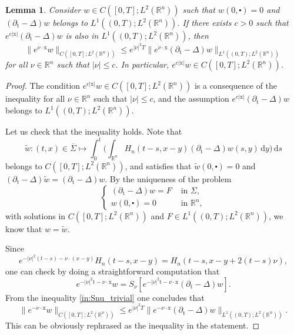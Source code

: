 \documentclass[10pt,a4paper]{amsart}
\newtheorem{lemma}[proposition]{Lemma}
\newcommand{\R}{\mathbb{R}}
\newcommand{\dd}{\mathrm{d}}
\newcommand{\tm}{\mathrm{t}}
\newcommand{\x}{\mathrm{x}}
\begin{document}
\begin{lemma}\label{lem:propagation_of_decay}\sl Consider $w \in C([0, T] ; L^{2}(\mathbb{R}^{n}))$ such that $w(0, \centerdot)=0$ 
and $(\partial_{\tm}-\Delta)w $ belongs to $ L^{1}((0, T) ; L^{2}(\mathbb{R}^{n}))$.
If there exists $c > 0$ such that 
$e^{c|\x|} (\partial_{\tm}-\Delta)w $ is also in $L^{1}((0, T) ; L^{2}(\mathbb{R}^{n}))$, then
\[ \|e^{\nu \cdot \x} w\|_{C([0, T] ; L^{2}(\mathbb{R}^{n}))} \leq e^{|\nu|^2 T} \|e^{\nu \cdot \x} (\partial_{\tm}-\Delta)w\|_{L^{1}((0, T) ; L^{2}(\mathbb{R}^{n}))} \]
for all $\nu \in \R^n$ such that $|\nu| \leq c$. In particular, 
$e^{c|\x|} w \in C([0, T] ; L^{2}(\mathbb{R}^{n}))$.
\end{lemma}

\begin{proof}
The condition $e^{c|\x|} w \in C([0, T] ; L^{2}(\mathbb{R}^{n}))$ is a consequence of the inequality for all $\nu \in \R^n$ such that $|\nu| \leq c$, and the assumption
$e^{c|\x|} (\partial_{\tm}-\Delta)w $ belongs to $ L^{1}((0, T) ; L^{2}(\mathbb{R}^{n}))$.

Let us check that the inequality holds.
Note that
\[ \tilde{w}: (t, x) \in \overline{\Sigma} \longmapsto \int_0^t \Big( \int_{\R^n} H_n (t-s, x-y) (\partial_{\tm}-\Delta)w(s, y) \, \dd y \Big) \, \dd s \]
belongs to $C([0, T] ; L^{2}(\mathbb{R}^{n}))$, and satisfies that $\tilde w(0, \centerdot)=0$ 
and $(\partial_{\tm}-\Delta)\tilde w = (\partial_{\tm}-\Delta)w $. By the uniqueness of the problem
$$
\begin{cases} (\partial_{\tm}-\Delta)w=F & \text { in } \Sigma, \\ w(0, \centerdot)=0 & \text { in } \mathbb{R}^{n},\end{cases}
$$
with solutions in $C([0, T] ; L^{2}(\mathbb{R}^{n}))$ and 
$F \in L^{1}((0, T) ; L^{2}(\mathbb{R}^{n}))$, we know that $w = \tilde w$.

Since 
\[e^{-|\nu|^2(t-s) - \nu \cdot (x-y)} H_n (t-s, x-y) = H_n (t-s, x-y + 2(t - s)\nu), \]
one can check by doing a straightforward computation that
\[e^{-|\nu|^2\tm - \nu \cdot \x} w = S_\nu [e^{-|\nu|^2\tm - \nu \cdot \x} (\partial_{\tm}-\Delta)w].\]
From the inequality \eqref{in:Snu_trivial} one concludes that
\[ \|e^{-\nu \cdot \x} w\|_{C([0, T] ; L^{2}(\mathbb{R}^{n}))} \leq e^{|\nu|^2 T} \|e^{-\nu \cdot \x} (\partial_{\tm}-\Delta)w\|_{L^{1}((0, T) ; L^{2}(\mathbb{R}^{n}))}. \]
This can be obviously rephrased as the inequality in the statement.
\end{proof}
\end{document}

